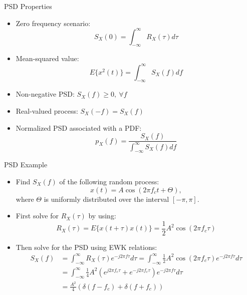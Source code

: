 \documentclass[10pt]{beamer}
\begin{document}
\begin{frame}[fragile]{PSD Properties}
  
  \begin{itemize}
    \item Zero frequency scenario:
    \begin{equation}
        S_X(0)=\int_{-\infty}^{\infty}R_X(\tau)d\tau\nonumber
    \end{equation}
    \item Mean-squared value:
    \begin{equation}
        E\{x^2(t)\}=\int_{-\infty}^{\infty}S_X(f)df\nonumber
    \end{equation}
    \item Non-negative PSD: $S_X(f)\ge{0},~\forall{f}$
    \item Real-valued process: $S_X(-f)=S_X(f)$
    \item Normalized PSD associated with a PDF:
    \begin{equation}
        p_X(f)=\frac{S_X(f)}{\int_{-\infty}^{\infty}S_X(f)df}\nonumber
    \end{equation}
  \end{itemize}
  
\end{frame}

\begin{frame}[fragile]{PSD Example}

  \begin{itemize}
    \item Find $S_X(f)$ of the following random process:
    \begin{equation}
        x(t)=A\cos(2\pi{f_c}t+\Theta),\nonumber
    \end{equation}
    where $\Theta$ is uniformly distributed over the interval $[-\pi,\pi]$.
    \item First solve for $R_X(\tau)$ by using:
    \begin{equation}
        R_X(\tau)=E\{x(t+\tau)x(t)\}=\frac{1}{2}A^2\cos(2\pi{f_c}\tau)\nonumber
    \end{equation}
    \item Then solve for the PSD using EWK relations:
    \begin{equation}
    \begin{split}
        S_X(f)&=\int_{-\infty}^{\infty}R_X(\tau)e^{-j2\pi{f}\tau}d\tau=\int_{-\infty}^{\infty}\frac{1}{2}A^2\cos(2\pi{f_c}\tau)e^{-j2\pi{f}\tau}d\tau\\
        &=\int_{-\infty}^{\infty}\frac{1}{4}A^2\left(e^{j2\pi{f_c}\tau}+e^{-j2\pi{f_c}\tau}\right)e^{-j2\pi{f}\tau}d\tau\\
        &=\frac{A^2}{4}(\delta(f-f_c)+\delta(f+f_c))\nonumber
    \end{split}
    \end{equation}
  \end{itemize}
  
\end{frame}
\end{document}
